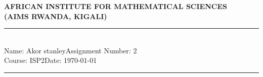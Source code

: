\documentclass[12pt,a4paper]{article}
\newcommand{\student}{Akor stanley}
\newcommand{\course}{ISP2}
\newcommand{\assignment}{2}
\begin{document}
\thispagestyle{empty}
\begin{center}
\textbf{AFRICAN INSTITUTE FOR MATHEMATICAL SCIENCES \\[0.5cm]
(AIMS RWANDA, KIGALI)}
\vspace{1.0cm}
\end{center}

\noindent
\rule{17cm}{0.2cm}\\[0.3cm]
Name: \student \hfill Assignment Number: \assignment\\[0.1cm]
Course: \course \hfill Date: \today\\
\rule{17cm}{0.05cm}
\vspace{1.0cm}

\
\end{document}
